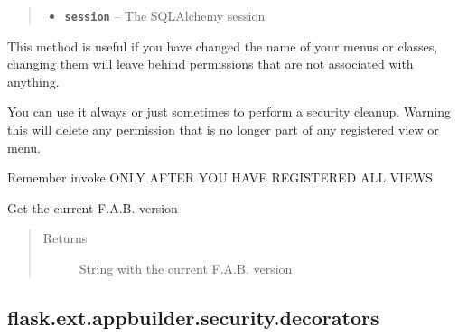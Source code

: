 \documentclass[letterpaper,10pt,english]{sphinxmanual}
\begin{document}
\begin{fulllineitems}
\begin{fulllineitems}
\begin{quote}
\begin{description}
\begin{itemize}
\item {} 
\textbf{\texttt{session}} -- The SQLAlchemy session

\end{itemize}

\end{description}\end{quote}

\end{fulllineitems}


\begin{fulllineitems}
\label{api:flask.ext.appbuilder.base.AppBuilder.security_cleanup}
This method is useful if you have changed
the name of your menus or classes,
changing them will leave behind permissions
that are not associated with anything.

You can use it always or just sometimes to
perform a security cleanup. Warning this will delete any permission
that is no longer part of any registered view or menu.

Remember invoke ONLY AFTER YOU HAVE REGISTERED ALL VIEWS

\end{fulllineitems}


\begin{fulllineitems}
\label{api:flask.ext.appbuilder.base.AppBuilder.version}
Get the current F.A.B. version
\begin{quote}\begin{description}
\item[{Returns}] \leavevmode
String with the current F.A.B. version

\end{description}\end{quote}

\end{fulllineitems}


\end{fulllineitems}



\subsection{flask.ext.appbuilder.security.decorators}
\label{api:flask-ext-appbuilder-security-decorators}\label{api:module-flask.ext.appbuilder.security.decorators}
\end{document}
